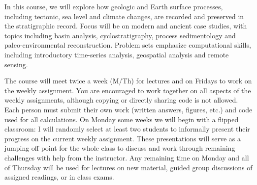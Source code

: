 In this course, we will explore how geologic and Earth surface processes, including tectonic, sea level and climate changes, are recorded and preserved in the stratigraphic record. Focus will be on modern and ancient case studies, with topics including basin analysis, cyclostratigraphy, process sedimentology and paleo-environmental reconstruction. Problem sets emphasize computational skills, including introductory time-series analysis, geospatial analysis and remote sensing.

The course will meet twice a week (M/Th) for lectures and on Fridays to work on the weekly assignment. You are encouraged to work together on all aspects of the weekly assignments, although copying or directly sharing code is not allowed. Each person must submit their own work (written answers, figures, etc.) and code used for all calculations. On Monday some weeks we will begin with a flipped classroom: I will randomly select at least two students to informally present their progress on the current weekly assignment. These presentations will serve as a jumping off point for the whole class to discuss and work through remaining challenges with help from the instructor. Any remaining time on Monday and all of Thursday will be used for lectures on new material, guided group discussions of assigned readings, or in class exams.
